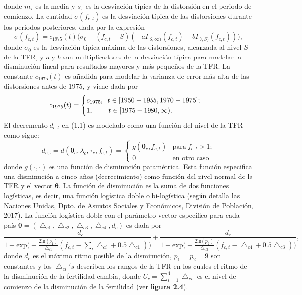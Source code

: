 donde $m_{\tau}$ es la media y $s_{\tau}$ es la desviación típica de la distorsión en el periodo de comienzo. La cantidad $\sigma(f_{c,t})$ es la desviación típica de las distorsiones durante los periodos posteriores, dada por la expresión 
$$\sigma(f_{c,t})=c_{1975}(t)\big(\sigma_{0}+(f_{c,t}-S)(-aI_{[S,\infty)}(f_{c,t})+bI_{[0,S)}(f_{c,t}))\big),$$
donde $\sigma_{0}$ es la desviación típica máxima de las distorsiones, alcanzada al nivel $S$ de la TFR, y $a$ y $b$ son multiplicadores de la desviación típica para modelar la disminución lineal para resultados mayores y más pequeños de la TFR. La constante $c_{1975}(t)$ es añadida para modelar la varianza de error más alta de las distorsiones antes de 1975, y viene dada por
\[
  c_{1975}(t)=\begin{cases}
             c_{1975},\hspace{0.2cm} t\in [1950-1955, 1970-1975];\\
            1,\hspace{0.8cm} t\in [1975-1980, \infty).
            \end{cases}
\]
El decremento $d_{c,t}$ en (1.1) es modelado como una función del nivel de la TFR como sigue:
\begin{equation}
d_{c,t}=d(\boldsymbol{\theta}_{c},\lambda_{c},\tau_{c},f_{c,t}) =
\begin{cases} 
      g(\boldsymbol{\theta}_{c},f_{c,t}) & \text{para}\ f_{c,t}> 1; \\
      0 & \text{en otro caso}
   \end{cases}
\end{equation}
donde $g(\cdot,\cdot)$ es una función de disminución paramétrica. Esta función especifica una disminución a cinco años (decrecimiento) como función del nivel normal de la TFR y el vector $\boldsymbol{\theta}$. La función de disminución es la suma de dos funciones logísticas, es decir, una función logística doble o bi-logística (según detalla las Naciones Unidas, Dpto. de Asuntos Sociales y Económicos, División de Población, 2017). La función logística doble con el parámetro vector específico para cada país $\boldsymbol{\theta}=(\bigtriangleup_{c1},\bigtriangleup_{c2},\bigtriangleup_{c3},\bigtriangleup_{c4},d_{c})$ es dada por
$$\frac{-d_{c}}{1+\text{exp}\Big(-\frac{2\text{ln}(p_{1})}{\bigtriangleup_{c1}}(f_{c,t}-\sum_{i}\bigtriangleup_{ci}+0.5\bigtriangleup_{c1})\Big)}+\frac{d_{c}}{1+\text{exp}\Big(-\frac{2\text{ln}(p_{2})}{\bigtriangleup_{c3}}(f_{c,t}-\bigtriangleup_{c4}+0.5\bigtriangleup_{c3})\Big)},$$
donde $d_{c}$ es el máximo ritmo posible de la disminución, $p_{1}=p_{2}=9$ son constantes y los $\bigtriangleup_{ci}'s$ describen los rangos de la TFR en los cuales el ritmo de la disminución de la fertilidad cambia, donde $U_{c}=\sum_{i=1}^{4}\bigtriangleup_{ci}$ es el nivel de comienzo de la disminución de la fertilidad (ver \textbf{figura 2.4}).\\
